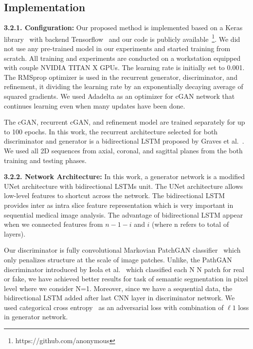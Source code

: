 \documentclass[10pt,twocolumn,letterpaper]{article}
\begin{document}
\subsection{Implementation}\textbf{3.2.1. Configuration:} Our proposed method is implemented based on a Keras library~\cite{chollet2015keras} with backend Tensorflow~\cite{abadi2016tensorflow} and our code is publicly available~\footnote{https://github.com/anonymous}. We did not use any pre-trained model in our experiments and started training from scratch. All training and experiments are conducted on a workstation equipped with couple NVIDIA TITAN X GPUs. The learning rate is initially set to 0.001. The RMSprop optimizer is used in the recurrent generator, discriminator, and refinement, it dividing the learning rate by an exponentially decaying average of squared gradients. We used Adadelta as an optimizer for cGAN network that continues learning even when many updates have been done.

The cGAN, recurrent cGAN, and refinement model are trained separately for up to 100 epochs. In this work, the recurrent architecture selected for both discriminator and generator is a bidirectional LSTM proposed by Graves et al.~\cite{graves2005framewise}. We used all 2D sequences from axial, coronal, and sagittal planes from the both training and testing phases.

\textbf{3.2.2. Network Architecture:} In this work, a generator network is a modified UNet architecture with bidirectional LSTMs unit. The UNet architecture allows low-level features to shortcut across the network. The bidirectional LSTM provides inter as intra slice feature representation which is very important in sequential medical image analysis. The advantage of bidirectional LSTM appear when we connected features from $n-1-i$ and $i$ (where n refers to total of layers).

Our discriminator is fully convolutional Markovian PatchGAN classifier~\cite{Phillipimagetoimage2017} which only penalizes structure at the scale of image patches.
Unlike, the PathGAN discriminator introduced by Isola et al.~\cite{Phillipimagetoimage2017} which classified each N  N patch for real or fake, we have achieved better results for task of semantic segmentation in pixel level where we consider N=1. Moreover, since we have a sequential data, the bidirectional LSTM added after last CNN layer in discriminator network. We used categorical cross entropy~\cite{nasr2002cross} as an adversarial loss with combination of $\ell1$ loss in generator network.
\end{document}
